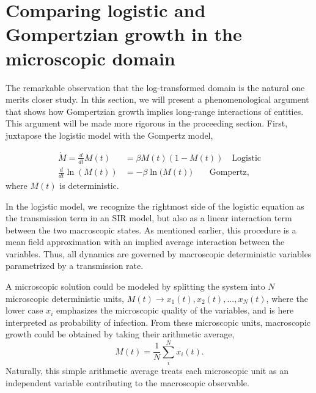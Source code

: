 \documentclass{article}
\begin{document}
\section*{Comparing logistic and Gompertzian growth in the microscopic domain}
The remarkable observation that the log-transformed domain is the natural one merits closer study. In this section, we will present a phenomenological argument that shows how Gompertzian growth implies long-range interactions of entities. This argument will be made more rigorous in the proceeding section. First, juxtapose the logistic model with the Gompertz model,

\begin{subequations}
\begin{align}
\dot{M} = \frac{d}{dt}M(t) & = \beta M(t) (1-M(t)) \quad \text{Logistic}\label{eq:compareLog}\\ 
\frac{d}{dt}\ln{(M(t))} & = -\beta \ln{(M(t)}) \quad\quad\text{Gompertz}\label{eq:compareGom},
\end{align}
\end{subequations}
where $M(t)$ is deterministic. 

In the logistic model, we recognize the rightmost side of the logistic equation as the transmission term in an SIR model, but also as a linear interaction term between the two macroscopic states. 
As mentioned earlier, this procedure is a mean field approximation with an implied average interaction between the variables. 
Thus, all dynamics are governed by macroscopic deterministic variables parametrized by a transmission rate.

A microscopic solution could be modeled by splitting the system into $N$ microscopic deterministic units, $M(t) \rightarrow x_1(t), x_2(t), ..., x_N(t)$, where the lower case $x_i$ emphasizes the microscopic quality of the variables, and is here interpreted as probability of infection. From these microscopic units, macroscopic growth could be obtained by taking their arithmetic average,
\begin{equation}
M(t) = \frac{1}{N}\sum_i^N x_i(t).
\end{equation}
Naturally, this simple arithmetic average treats each microscopic unit as an independent variable contributing to the macroscopic observable.
\end{document}
